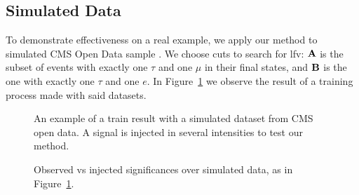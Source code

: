 \documentclass[paper/ddppaper2.tex]{subfiles}
\begin{document}
\subsection{Simulated Data}

To demonstrate effectiveness on a real example, we apply our method to simulated CMS Open Data sample \cite{CMS_OpenData_VVTo2L2Nu_2016}. We choose cuts to search for \gls{lfv}: ${\mathbf{A}}$ is the subset of events with exactly one $\tau$ and one $\mu$ in their final states, and ${\mathbf{B}}$ is the one with exactly one $\tau$ and one $e$. In Figure~\ref{fig:cms_open_data_train} we observe the result of a training process made with said datasets.

\begin{figure}
    \caption{An example of a train result with a simulated dataset from CMS open data. A signal is injected in several intensities to test our method.}
    \label{fig:cms_open_data_train}
\end{figure}


\begin{figure}
    \caption{Observed vs injected significances over simulated data, as in Figure~\ref{fig:cms_open_data_train}.}
    \label{fig:cms_open_data_significances}
\end{figure}
\end{document}
